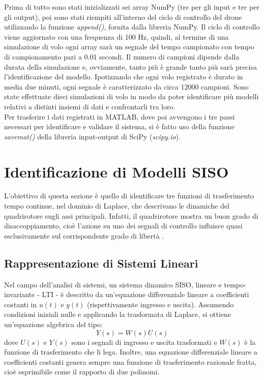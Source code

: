 Prima di tutto sono stati inizializzati sei array NumPy (tre per gli input e tre per gli output), poi sono stati riempiti all'interno del ciclo di controllo del drone utilizzando la funzione \emph{append()}, fornita dalla libreria NumPy. Il ciclo di controllo viene aggiornato con una frequenza di 100 Hz, quindi, al termine di una simulazione di volo ogni array sarà un segnale del tempo campionato con tempo di campionamento pari a 0.01 secondi. Il numero di campioni dipende dalla durata della simulazione e, ovviamente, tanto più è grande tanto più sarà precisa l'identificazione del modello. Ipotizzando che ogni volo registrato è durato in media due minuti, ogni segnale è caratterizzato da circa 12000 campioni. Sono state effettuate dieci simulazioni di volo in modo da poter identificare più modelli relativi a distinti insiemi di dati e confrontarli tra loro.\\

Per trasferire i dati registrati in MATLAB, dove poi avvengono i tre passi necessari per identificare e validare il sistema, si è fatto uso della funzione \emph{savemat()} \cite{savemat} della libreria input-output di SciPy (\emph{scipy.io}).


\section{Identificazione di Modelli SISO}
L'obiettivo di questa sezione è quello di identificare tre funzioni di trasferimento tempo continue, nel dominio di Laplace, che descrivano le dinamiche del quadrirotore sugli assi principali. Infatti, il quadrirotore mostra un buon grado di disaccoppiamento, cioè l'azione su uno dei segnali di controllo influisce quasi esclusivamente sul corrispondente grado di libertà \cite{idEsempio} \cite{decoupledDynamics}.

\subsection{Rappresentazione di Sistemi Lineari}
Nel campo dell'analisi di sistemi, un sistema dinamico \acs{SISO}, lineare e tempo-invariante - \ac{LTI} - è descritto da un'equazione differenziale lineare a coefficienti costanti in $u(t)$ e $y(t)$ (rispettivamente ingresso e uscita). Assumendo condizioni iniziali nulle e applicando la trasformata di Laplace, si ottiene un'equazione algebrica del tipo:
\[ Y(s) = W(s)U(s) \]
dove $U(s)$ e $Y(s)$ sono i segnali di ingresso e uscita trasformati e $W(s)$ è la funzione di trasferimento che li lega. Inoltre, una equazione differenziale lineare a coefficienti costanti genera sempre una funzione di trasferimento razionale fratta, cioè esprimibile come il rapporto di due polinomi.

